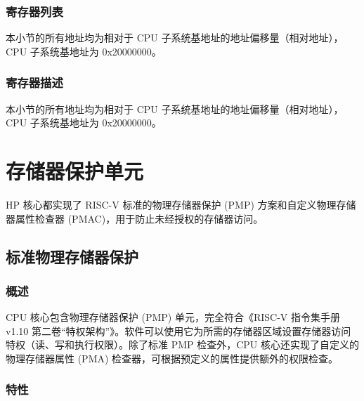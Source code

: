 \documentclass[main\_\_CN.tex]{subfiles}
\begin{document}

\hypertarget{riscvcpu-clint-reg-summ}{}
\subsubsection{寄存器列表}
\label{sec:riscvcpu-clint-reg-summ}

本小节的所有地址均为相对于 CPU 子系统基地址的地址偏移量（相对地址），CPU 子系统基地址为 0x20000000。





\subsubsection{寄存器描述}

本小节的所有地址均为相对于 CPU 子系统基地址的地址偏移量（相对地址），CPU 子系统基地址为 0x20000000。




\newpage
\section{存储器保护单元}
HP 核心都实现了 RISC-V 标准的物理存储器保护 (PMP) 方案和自定义物理存储器属性检查器 (PMAC)，用于防止未经授权的存储器访问。


\subsection{标准物理存储器保护}
\label{sec:riscvcpu-pmp}
\subsubsection{概述}
\label{sec:riscvcpu-pmp-overview}
CPU 核心包含物理存储器保护 (PMP) 单元，完全符合《RISC-V 指令集手册 v1.10 第二卷“特权架构”》。软件可以使用它为所需的存储器区域设置存储器访问特权（读、写和执行权限）。除了标准 PMP 检查外，CPU 核心还实现了自定义的物理存储器属性 (PMA) 检查器，可根据预定义的属性提供额外的权限检查。

\subsubsection{特性}
\label{sec:riscvcpu-pmp-features}
\end{document}

